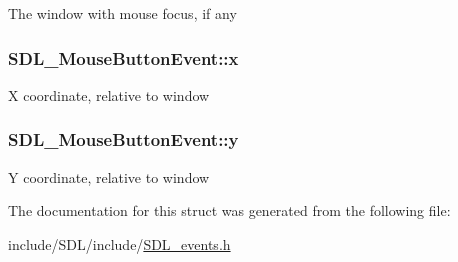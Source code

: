 The window with mouse focus, if any \hypertarget{struct_s_d_l___mouse_button_event_a5bb9c61b86e999f58637511e32e3a076}{
\subsubsection[{x}]{ S\-D\-L\-\_\-\-Mouse\-Button\-Event\-::x}}\label{struct_s_d_l___mouse_button_event_a5bb9c61b86e999f58637511e32e3a076}
X coordinate, relative to window \hypertarget{struct_s_d_l___mouse_button_event_a7ccb5c55a7ddadce723f4ea6d5269540}{
\subsubsection[{y}]{ S\-D\-L\-\_\-\-Mouse\-Button\-Event\-::y}}\label{struct_s_d_l___mouse_button_event_a7ccb5c55a7ddadce723f4ea6d5269540}
Y coordinate, relative to window 

The documentation for this struct was generated from the following file\-:\begin{DoxyCompactItemize}
\item 
include/\-S\-D\-L/include/\hyperlink{_s_d_l__events_8h}{S\-D\-L\-\_\-events.\-h}\end{DoxyCompactItemize}
